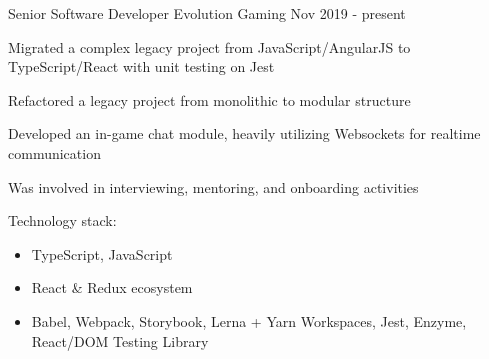 

\begin{cventries}


  \cventry
    {Senior Software Developer} %
    {Evolution Gaming} %
    {} %
    {Nov 2019 - present} %
    {
      \begin{cvitems}
        \item Migrated a complex legacy project from JavaScript/AngularJS to TypeScript/React with unit testing on Jest
        \item Refactored a legacy project from monolithic to modular structure
        \item Developed an in-game chat module, heavily utilizing Websockets for realtime communication
        \item Was involved in interviewing, mentoring, and onboarding activities
      \end{cvitems}
      \vspace{5mm}
      Technology stack:
      \begin{itemize}[leftmargin=2ex, nosep, noitemsep]
        \item TypeScript, JavaScript
        \item React \& Redux ecosystem
        \item Babel, Webpack, Storybook, Lerna + Yarn Workspaces, Jest, Enzyme, React/DOM Testing Library
      \end{itemize}
      \vspace{-4.0mm}
    }


\end{cventries}
